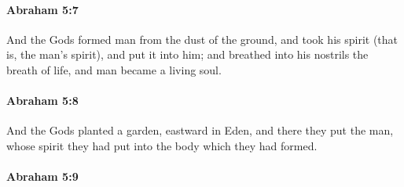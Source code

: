 		\paragraph{Abraham 5:7} %
			\label{ABRAHAM-5-7}

			And the Gods formed man from the dust of the ground, and took his spirit (that is, the man's spirit), and put it into him; and breathed into his nostrils the breath of life, and man became a living soul.


		\paragraph{Abraham 5:8} %
			\label{ABRAHAM-5-8}

			And the Gods planted a garden, eastward in Eden, and there they put the man, whose spirit they had put into the body which they had formed.


		\paragraph{Abraham 5:9} %
			\label{ABRAHAM-5-9}

